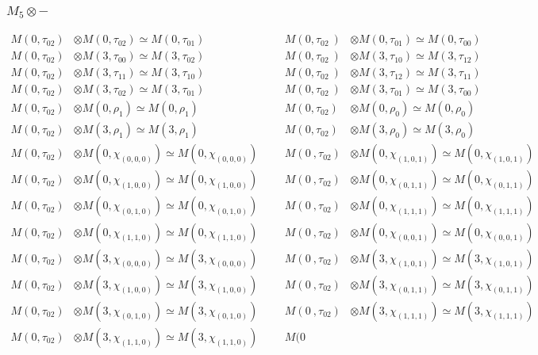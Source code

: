 \subsubsection{$M_5\otimes -$}
\begin{align*}
M(0,\tau_{02}) &\otimes M(0,\tau_{02}) \simeq M(0,\tau_{01}) &&& M(0,\tau_{02}\
) &\otimes M(0,\tau_{01}) \simeq M(0,\tau_{00})\\
M(0,\tau_{02}) &\otimes M(3,\tau_{00}) \simeq M(3,\tau_{02}) &&& M(0,\tau_{02}\
) &\otimes M(3,\tau_{10}) \simeq M(3,\tau_{12})\\
M(0,\tau_{02}) &\otimes M(3,\tau_{11}) \simeq M(3,\tau_{10}) &&& M(0,\tau_{02}\
) &\otimes M(3,\tau_{12}) \simeq M(3,\tau_{11})\\
M(0,\tau_{02}) &\otimes M(3,\tau_{02}) \simeq M(3,\tau_{01}) &&& M(0,\tau_{02}\
) &\otimes M(3,\tau_{01}) \simeq M(3,\tau_{00})\\
M(0,\tau_{02}) &\otimes M(0,\rho_{1}) \simeq M(0,\rho_{1}) &&& M(0,\tau_{02}) \
&\otimes M(0,\rho_{0}) \simeq M(0,\rho_{0})\\
M(0,\tau_{02}) &\otimes M(3,\rho_{1}) \simeq M(3,\rho_{1}) &&& M(0,\tau_{02}) \
&\otimes M(3,\rho_{0}) \simeq M(3,\rho_{0})\\
M(0,\tau_{02}) &\otimes M(0,\chi_{(0,0,0)}) \simeq M(0,\chi_{(0,0,0)}) &&& M(0\
,\tau_{02}) &\otimes M(0,\chi_{(1,0,1)}) \simeq M(0,\chi_{(1,0,1)})\\
M(0,\tau_{02}) &\otimes M(0,\chi_{(1,0,0)}) \simeq M(0,\chi_{(1,0,0)}) &&& M(0\
,\tau_{02}) &\otimes M(0,\chi_{(0,1,1)}) \simeq M(0,\chi_{(0,1,1)})\\
M(0,\tau_{02}) &\otimes M(0,\chi_{(0,1,0)}) \simeq M(0,\chi_{(0,1,0)}) &&& M(0\
,\tau_{02}) &\otimes M(0,\chi_{(1,1,1)}) \simeq M(0,\chi_{(1,1,1)})\\
M(0,\tau_{02}) &\otimes M(0,\chi_{(1,1,0)}) \simeq M(0,\chi_{(1,1,0)}) &&& M(0\
,\tau_{02}) &\otimes M(0,\chi_{(0,0,1)}) \simeq M(0,\chi_{(0,0,1)})\\
M(0,\tau_{02}) &\otimes M(3,\chi_{(0,0,0)}) \simeq M(3,\chi_{(0,0,0)}) &&& M(0\
,\tau_{02}) &\otimes M(3,\chi_{(1,0,1)}) \simeq M(3,\chi_{(1,0,1)})\\
M(0,\tau_{02}) &\otimes M(3,\chi_{(1,0,0)}) \simeq M(3,\chi_{(1,0,0)}) &&& M(0\
,\tau_{02}) &\otimes M(3,\chi_{(0,1,1)}) \simeq M(3,\chi_{(0,1,1)})\\
M(0,\tau_{02}) &\otimes M(3,\chi_{(0,1,0)}) \simeq M(3,\chi_{(0,1,0)}) &&& M(0\
,\tau_{02}) &\otimes M(3,\chi_{(1,1,1)}) \simeq M(3,\chi_{(1,1,1)})\\
M(0,\tau_{02}) &\otimes M(3,\chi_{(1,1,0)}) \simeq M(3,\chi_{(1,1,0)}) &&& M(0\

\end{align*}
